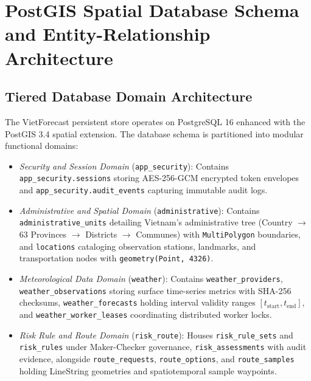 \section{PostGIS Spatial Database Schema and Entity-Relationship Architecture}
\label{sec:postgis_erd_schema}

\subsection{Tiered Database Domain Architecture}
The VietForecast persistent store operates on PostgreSQL 16 enhanced with the PostGIS 3.4 spatial extension. The database schema is partitioned into modular functional domains:
\begin{itemize}
    \item[-] \textit{Security and Session Domain} (\texttt{app\_security}): Contains \texttt{app\_security.}\allowbreak\texttt{sessions} storing AES-256-GCM encrypted token envelopes and \texttt{app\_security.audit\_events} capturing immutable audit logs.
    \item[-] \textit{Administrative and Spatial Domain} (\texttt{administrative}): Contains \texttt{administrative\_}\allowbreak\texttt{units} detailing Vietnam's administrative tree (Country $\rightarrow$ 63 Provinces $\rightarrow$ Districts $\rightarrow$ Communes) with \texttt{MultiPolygon} boundaries, and \texttt{locations} cataloging observation stations, landmarks, and transportation nodes with \texttt{geometry(Point, 4326)}.
    \item[-] \textit{Meteorological Data Domain} (\texttt{weather}): Contains \texttt{weather\_}\allowbreak\texttt{providers}, \texttt{weather\_}\allowbreak\texttt{observations} storing surface time-series metrics with SHA-256 checksums, \texttt{weather\_}\allowbreak\texttt{forecasts} holding interval validity ranges $[t_{\text{start}}, t_{\text{end}}]$, and \texttt{weather\_}\allowbreak\texttt{worker\_}\allowbreak\texttt{leases} coordinating distributed worker locks.
    \item[-] \textit{Risk Rule and Route Domain} (\texttt{risk\_route}): Houses \texttt{risk\_}\allowbreak\texttt{rule\_}\allowbreak\texttt{sets} and \texttt{risk\_}\allowbreak\texttt{rules} under Maker-Checker governance, \texttt{risk\_}\allowbreak\texttt{assessments} with audit evidence, alongside \texttt{route\_}\allowbreak\texttt{requests}, \texttt{route\_}\allowbreak\texttt{options}, and \texttt{route\_}\allowbreak\texttt{samples} holding LineString geometries and spatiotemporal sample waypoints.
\end{itemize}

